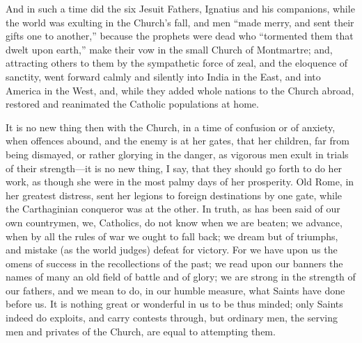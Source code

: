 And in such a time did the six Jesuit Fathers, Ignatius and his
companions, while the world was exulting in the Church's fall, and men
``made merry, and sent their gifts one to another,'' because
the prophets were dead who ``tormented them that dwelt upon
earth,'' make their vow in the small Church of Montmartre; and,
attracting others to them by the sympathetic force of zeal, and the
eloquence of sanctity, went forward calmly and silently into India in
the East, and into America in the West, and, while they added whole
nations to the Church abroad, restored and reanimated the Catholic
populations at home.

It is no new thing then with the Church, in a time of confusion or
of anxiety, when offences abound, and the enemy is at her gates, that
her children, far from being dismayed, or rather glorying in the
danger, as vigorous men exult in trials of their strength—it is no
new thing, I say, that they should go forth to do her work, as though
she were in the most palmy days of her prosperity. Old Rome, in her
greatest distress, sent her legions to foreign destinations by one
gate, while the Carthaginian conqueror was at the other. In truth, as
has been said of our own countrymen, we, Catholics, do not know when
we are beaten; we advance, when by all the rules of war we ought to
fall back; we dream but of triumphs, and mistake (as the world judges)
defeat for victory. For we have upon us the omens of success in the
recollections of the past; we read upon our banners the names of many
an old field of battle and of glory; we are strong in the strength of
our fathers, and we mean to do, in our humble measure, what Saints
have done before us. It is nothing great or wonderful in us to be thus
minded; only Saints indeed do exploits, and carry contests through,
but ordinary men, the serving men and privates of the Church, are
equal to attempting them.

